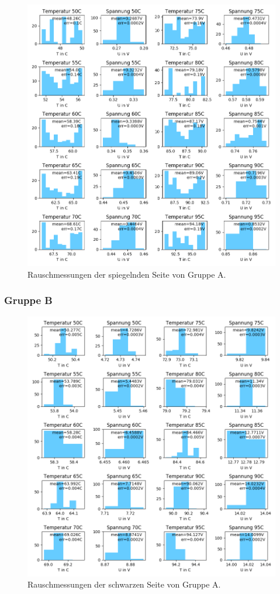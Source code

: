 \documentclass[12pt,a4paper]{article}
\begin{document}
\begin{figure}[H]
\includegraphics[scale=0.8]{Bilder/Rauschen_A_spiegel_2.png}
\caption{Rauschmessungen der spiegelnden Seite von Gruppe A.}
\end{figure}

\subsubsection{Gruppe B}

\begin{figure}[H]
\includegraphics[scale=0.8]{Bilder/Rauschen_B_schwarz_2.png}
\caption{Rauschmessungen der schwarzen Seite von Gruppe A.}
\end{figure}
\end{document}
